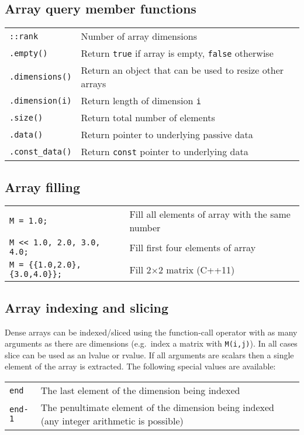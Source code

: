 \documentclass[10pt,a4,landscape]{article}
\def\code#1{\texttt{#1}}
\begin{document}
\subsection*{Array query member functions}
\begin{tabular}{ll}
\code{::rank} & Number of array dimensions\\
\code{.empty()} & Return \code{true} if array is empty, \code{false} otherwise\\
\code{.dimensions()} & Return an object that can be used to resize other arrays\\
\code{.dimension(i)} & Return length of dimension \code{i}\\
\code{.size()} & Return total number of elements\\
\code{.data()} & Return pointer to underlying passive data\\
\code{.const\_data()} & Return \code{const} pointer to underlying data\\
\end{tabular}
\subsection*{Array filling}
\begin{tabular}{ll}
\code{M = 1.0;} & Fill all elements of array with the same number\\
\code{M <{}< 1.0, 2.0, 3.0, 4.0;} & Fill first four elements of array\\
\code{M = \{\{1.0,2.0\},\{3.0,4.0\}\};} & Fill 2$\times$2 matrix (C++11)\\
\end{tabular}
\subsection*{Array indexing and slicing}
Dense arrays can be indexed/sliced using the function-call operator
with as many arguments as there are dimensions (e.g.\ index a matrix
with \code{M(i,j)}). In all cases slice can be used as an lvalue or
rvalue. If all arguments are scalars then a single element of the
array is extracted. The following special values are available:\\
\begin{tabular}{ll}
\code{end} & The last element of the dimension being indexed\\
\code{end-1} & The penultimate element of the dimension being indexed (any integer arithmetic is possible)\\
\end{tabular}
\end{document}
